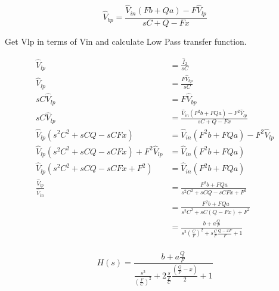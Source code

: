 \documentclass{article}
\begin{document}
\begin{equation}
  \hat{V}_{bp} = \frac{\hat{V}_{in}(Fb + Qa) - F\hat{V}_{lp}}{sC + Q - Fx}
\end{equation}

Get Vlp in terms of Vin and calculate Low Pass transfer function.

\begin{equation*}
\begin{split}
  \hat{V}_{lp} & = \frac{\hat{I}_2}{sC} \\
  \hat{V}_{lp} & = \frac{F\hat{V}_{bp}}{sC} \\
  sC\hat{V}_{lp} & = F\hat{V}_{bp} \\
  sC\hat{V}_{lp} & = \frac{\hat{V}_{in}(F^2b + FQa) - F^2\hat{V}_{lp}}{sC + Q - Fx} \\
  \hat{V}_{lp}(s^2C^2 + sCQ - sCFx) & = \hat{V}_{in}(F^2b + FQa) - F^2\hat{V}_{lp} \\
  \hat{V}_{lp}(s^2C^2 + sCQ - sCFx) + F^2\hat{V}_{lp} & = \hat{V}_{in}(F^2b + FQa) \\
  \hat{V}_{lp}(s^2C^2 + sCQ -sCFx + F^2) & = \hat{V}_{in}(F^2b + FQa) \\
  \frac{\hat{V}_{lp}}{\hat{V}_{in}} & = \frac{F^2b + FQa}{s^2C^2 + sCQ - sCFx + F^2} \\
  & = \frac{F^2b + FQa}{s^2C^2 + sC(Q - Fx) + F^2} \\
  & = \frac{b + a\frac{Q}{F}}{s^2{(\frac{C}{F})}^2 + s\frac{C}{F}\frac{Q - xF}{F} + 1} \\
\end{split}
\end{equation*}

\begin{equation}
  H(s) = \frac{b + a\frac{Q}{F}}{\frac{s^2}{{(\frac{F}{C})}^2} + 2\frac{s}{\frac{F}{C}}\frac{(\frac{Q}{F} - x)}{2} + 1}
\end{equation}
\end{document}
